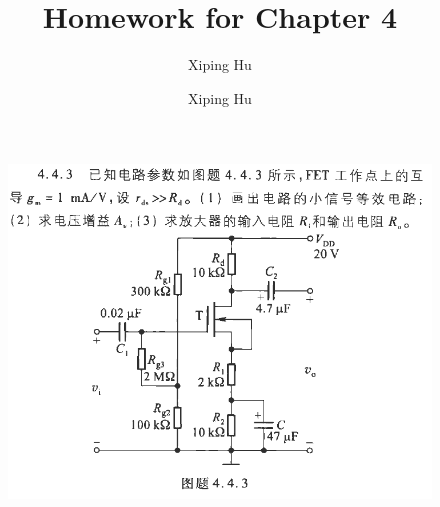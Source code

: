 \documentclass{article}
\author{Xiping Hu}
\author{Xiping Hu}
\affil{https://hxp.plus/}
\title{Homework for Chapter 4}
\begin{document}
\maketitle

\begin{figure}[H]
  \centering
  \includegraphics[width=\linewidth]{figures/Problem443}
  \label{fig:}
\end{figure}
\end{document}
